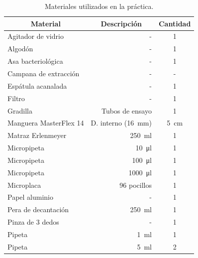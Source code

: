 \documentclass{ITESO-Project}
\begin{document}
\begin{table}[H]
    \centering
    \caption{Materiales utilizados en la práctica.}
    \begin{tabular}{lrc}
        \toprule
        \multicolumn{1}{c}{\textbf{Material}} & \multicolumn{1}{c}{\textbf{Descripción}} & \multicolumn{1}{c}{\textbf{Cantidad}}\\ \hline
            Agitador de   vidrio     & -                            & \num{1}   \\
            Algodón                  & -                            & \num{1}   \\
            Asa   bacteriológica     & -                            & \num{1}   \\
            Campana de extracción    & -                            & -   \\
            Espátula   acanalada     & -                            & \num{1}   \\
            Filtro                   & -                            & \num{1}   \\
            Gradilla                 & Tubos de ensayo              & \num{1}   \\
            Manguera MasterFlex   14 & D. interno (\qty{16}{\mm})   & \qty{5}{\cm} \\
            Matraz   Erlenmeyer      & \qty{250}{\ml}               & \num{1}   \\
            Micropipeta              & \qty{10}{\micro\l}           & \num{1}   \\
            Micropipeta              & \qty{100}{\micro\l}          & \num{1}   \\
            Micropipeta              & \qty{1000}{\micro\l}         & \num{1}   \\
            Microplaca               & 96 pocillos                  & \num{1}   \\
            Papel aluminio           & -                            & \num{1}   \\
            Pera de   decantación    & \qty{250}{\ml}               & \num{1}   \\
            Pinza de 3   dedos       & -                            & \num{1}   \\
            Pipeta                   & \qty{1}{\ml}                 & \num{1}   \\
            Pipeta                   & \qty{5}{\ml}                 & \num{2}   \\

\end{tabular}
\end{table}
\end{document}
